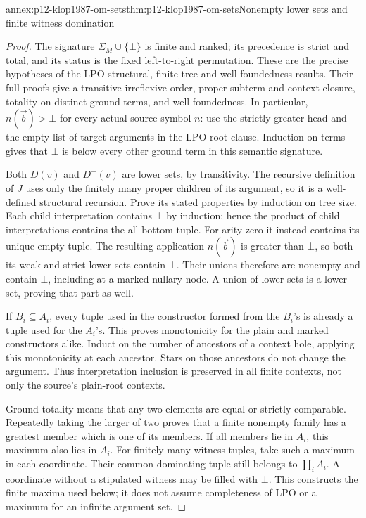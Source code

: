 \begin{annexitem}{annex:p12-klop1987-om-sets}{thm:p12-klop1987-om-sets}{Nonempty lower sets and finite witness domination}
\begin{proof}
The signature \(\Sigma_M\cup\{\bot\}\) is finite and ranked;
its precedence is strict and total, and its status is the fixed
left-to-right permutation. These are the precise hypotheses of the
LPO structural, finite-tree and well-foundedness results. Their full
proofs give a transitive irreflexive order, proper-subterm and context
closure, totality on distinct ground terms, and well-foundedness.
In particular, \(n(\vec b)>\bot\) for every actual source symbol
\(n\): use the strictly greater head and the empty list of target
arguments in the LPO root clause. Induction on terms gives that
\(\bot\) is below every other ground term in this semantic signature.

Both \(D(v)\) and \(D^-(v)\) are lower sets, by transitivity.
The recursive definition of \(J\) uses only the finitely many proper
children of its argument, so it is a well-defined structural recursion.
Prove its stated properties by induction on tree size. Each child
interpretation contains \(\bot\) by induction; hence the product of
child interpretations contains the all-bottom tuple. For arity zero
it instead contains its unique empty tuple. The resulting application
\(n(\vec b)\) is greater than \(\bot\), so both its weak and
strict lower sets contain \(\bot\). Their unions therefore are
nonempty and contain \(\bot\), including at a marked nullary node.
A union of lower sets is a lower set, proving that part as well.

If \(B_i\subseteq A_i\), every tuple used in the constructor
formed from the \(B_i\)'s is already a tuple used for the \(A_i\)'s.
This proves monotonicity for the plain and marked constructors alike.
Induct on the number of ancestors of a context hole, applying this
monotonicity at each ancestor. Stars on those ancestors do not change
the argument. Thus interpretation inclusion is preserved in all
finite contexts, not only the source's plain-root contexts.

Ground totality means that any two elements are equal or strictly
comparable. Repeatedly taking the larger of two proves that a finite
nonempty family has a greatest member which is one of its members.
If all members lie in \(A_i\), this maximum also lies in \(A_i\).
For finitely many witness tuples, take such a maximum in each
coordinate. Their common dominating tuple still belongs to
\(\prod_i A_i\). A coordinate without a stipulated witness may
be filled with \(\bot\). This constructs the finite maxima used
below; it does not assume completeness of LPO or a maximum for an
infinite argument set.


\end{proof}
\end{annexitem}
